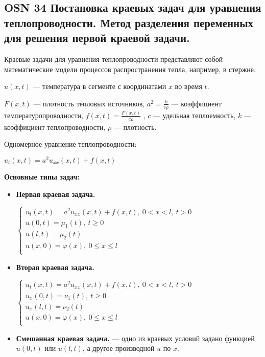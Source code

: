 \subsection*{OSN 34 Постановка краевых задач для уравнения теплопроводности.  Метод разделения переменных для решения первой краевой задачи.}

Краевые задачи для уравнения теплопроводности представляют собой математические модели процессов распространения тепла, например, в стержне.
    
$u(x,t)$ --- температура в сегменте с координатами $x$ во время $t$.

$F(x, t)$ --- плотность тепловых источников, $a^2 = \frac{k}{c\rho}$ --- коэффициент температуропроводности, $f(x,t)=\frac{F(x,t)}{c\rho}$ , $c$ --- удельная теплоемкость, $k$ --- коэффициент теплопроводности, $\rho$ --- плотность.

\bigbreak

Одномерное уравнение теплопроводности:

$u_t(x,t)=a^2u_{xx}(x,t)+f(x,t)$


\textbf{Основные типы задач:}
\begin{itemize}
    \item \textbf{Первая краевая задача.}
    
    $\begin{cases}
    u_t(x,t)=a^2u_{xx}(x,t)+f(x,t),~0<x<l,~t>0&\\
    u(0,t)=\mu_1(t),~t\geqslant0&\\
    u(l,t)=\mu_2(t)&\\
    u(x,0)=\varphi(x),~0\leqslant x\leqslant l&\\
    \end{cases}$
    \item \textbf{Вторая краевая задача.}
    
    $\begin{cases}
    u_t(x,t)=a^2u_{xx}(x,t)+f(x,t),~0<x<l,~t>0&\\
    u_x(0,t)=\nu_1(t),~t\geqslant0&\\
    u_x(l,t)=\nu_2(t)&\\
    u(x,0)=\varphi(x),~0\leqslant x\leqslant l&\\
    \end{cases}$
    \item \textbf{Смешанная краевая задача.} --- одно из краевых условий задано функцией $u(0,t)$ или $u(l,t)$, а другое производной $u$ по $x$.
\end{itemize}

